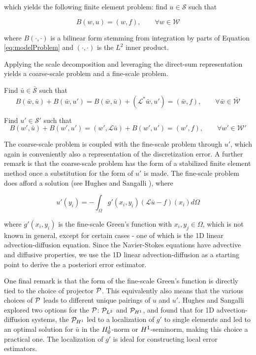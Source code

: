 \noindent which yields the following finite element problem:
find $u \in \mathcal{S}$ such that

\begin{equation}
    B(w,u) = (w,f), \qquad \forall w \in \mathcal{W}
\end{equation} 

\noindent where $B(\cdot,\cdot)$ is a bilinear form stemming from integration by parts of Equation \ref{eq:modelProblem} and $(\cdot,\cdot)$ is the $L^2$ inner product.

Applying the scale decomposition and leveraging the direct-sum representation yields a coarse-scale problem and a fine-scale problem.

Find $\bar{u} \in \bar{\mathcal{S}}$ such that
\begin{equation}
    B(\bar{w},\bar{u}) + B(\bar{w},u') = B(\bar{w},\bar{u}) + (\mathcal{L}^{*}\bar{w},u') = (\bar{w},f), \qquad \forall \bar{w} \in \bar{\mathcal{W}}
\end{equation} 

Find $u' \in \mathcal{S}'$ such that
\begin{equation}
    B(w',\bar{u}) + B(w',u') = (w',\mathcal{L}\bar{u}) + B(w',u') = (w',f), \qquad \forall w' \in \mathcal{W}'
    \label{eq:fineScale}
\end{equation}

The coarse-scale problem is coupled with the fine-scale problem through $u'$, which again is conveniently also a representation of the discretization error.
A further remark is that the coarse-scale problem has the form of a stabilized finite element method once a substitution for the form of $u'$ is made.
The fine-scale problem does afford a solution (see Hughes and Sangalli \cite{hughes2007variational}), where

\begin{equation}
    u'(y_i) = -\int_{\Omega} g'(x_i,y_i)(\mathcal{L}\bar{u}-f)(x_i) d\Omega
    \label{eq:uPrimeSoln}
\end{equation} 

\noindent where $g'(x_i,y_i)$ is the fine-scale Green's function with $x_i,y_j \in \Omega$, which is not known in general, except for certain cases - one of which is the 1D linear advection-diffusion equation.
Since the Navier-Stokes equations have advective and diffusive properties, we use the 1D linear advection-diffusion as a starting point to derive the a posteriori error estimator.

One final remark is that the form of the fine-scale Green's function is directly tied to the choice of projector $\mathcal{P}$.
This equivalently also means that the various choices of $\mathcal{P}$ leads to different unique pairings of $u$ and $u'$.
Hughes and Sangalli \cite{hughes2007variational} explored two options for the $\mathcal{P}$: $\mathcal{P}_{L^2}$ and $\mathcal{P}_{H^1}$, and found that for 1D advection-diffusion systems, the $\mathcal{P}_{H^1}$ led to a localization of $g'$ to single elements and led to an optimal solution for $\bar{u}$ in the $H^{1}_0$-norm or $H^{1}$-seminorm, making this choice a practical one.
The localization of $g'$ is ideal for constructing local error estimators.

